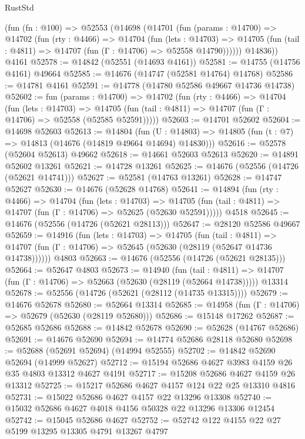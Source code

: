\begin{lexlean}{RustStd}
\begin{coremodule}
    (fun (fn : @100) =>
    @52553
      (@14698
        (@14701
          (fun (params : @14700) =>
          @14702
            (fun (rty : @4466) =>
            @14704
              (fun (lets : @14703) =>
              @14705 (fun (tail : @4811) => @14707 (fun (Γ : @14706) => @52558 @14790))))))
        @14836))
    @4161
@52578 := @14842 (@52551 (@14693 @4161))
@52581 := @14755 (@14756 @4161) @49664
@52585 := @14676 (@14747 (@52581 @14764) @14768)
@52586 := @14781 @4161
@52591 := @14778 (@14780 @52586 @49667 @14736 @14738)
@52602 := fun (params : @14700) =>
  @14702
    (fun (rty : @4466) =>
    @14704
      (fun (lets : @14703) =>
      @14705 (fun (tail : @4811) => @14707 (fun (Γ : @14706) => @52558 (@52585 @52591)))))
@52603 := @14701 @52602
@52604 := @14698 @52603
@52613 := @14804
    (fun (U : @14803) => @14805 (fun (t : @7) => @14813 (@14676 (@14819 @49664 @14694) @14830)))
@52616 := @52578 (@52604 @52613) @49662
@52618 := @14661 @52603 @52613
@52620 := @14891 @52602 @13261
@52621 := @14728 @13261
@52625 := @14676 (@52556 (@14726 (@52621 @14741)))
@52627 := @52581 (@14763 @13261)
@52628 := @14747 @52627
@52630 := @14676 (@52628 @14768)
@52641 := @14894
    (fun (rty : @4466) =>
    @14704
      (fun (lets : @14703) =>
      @14705 (fun (tail : @4811) => @14707 (fun (Γ : @14706) => @52625 (@52630 @52591)))))
    @4518
@52645 := @14676 (@52556 (@14726 (@52621 @28113)))
@52647 := @28120 @52586 @49667
@52659 := @14916
    (fun (lets : @14703) =>
    @14705
      (fun (tail : @4811) =>
      @14707 (fun (Γ : @14706) => @52645 (@52630 (@28119 (@52647 @14736 @14738))))))
    @4803
@52663 := @14676 (@52556 (@14726 (@52621 @28135)))
@52664 := @52647 @4803
@52673 := @14940
    (fun (tail : @4811) => @14707 (fun (Γ : @14706) => @52663 (@52630 (@28119 (@52664 @14738)))))
    @13314
@52678 := @52556 (@14726 (@52621 (@28112 (@14735 @13315))))
@52679 := @14676 @52678
@52680 := @52664 @13314
@52685 := @14958 (fun (Γ : @14706) => @52679 (@52630 (@28119 @52680)))
@52686 := @15148 @17262
@52687 := @52685 @52686
@52688 := @14842 @52678
@52690 := @52628 (@14767 @52686)
@52691 := @14676 @52690
@52694 := @14774 @52686 @28118 @52680
@52698 := @52688 (@52691 @52694) (@14994 @52555)
@52702 := @14842 @52690 @52694 (@14999 @52627)
@52712 := @15194 @52686 @4627 @3983 @4159 @26 @35 @4803 @13312 @4627 @4191
@52717 := @15208 @52686 @4627 @4159 @26 @13312
@52725 := @15217 @52686 @4627 @4157 @124 @22 @25 @13310 @4816
@52731 := @15022 @52686 @4627 @4157 @22 @13296 @13308
@52740 := @15032 @52686 @4627 @4018 @4156 @50328 @22 @13296 @13306 @12454
@52742 := @15045 @52686 @4627
@52752 := @52742 @122 @4155 @22 @27 @5199 @13295 @13305 @4791 @13267 @4797

\end{coremodule}
\end{lexlean}
